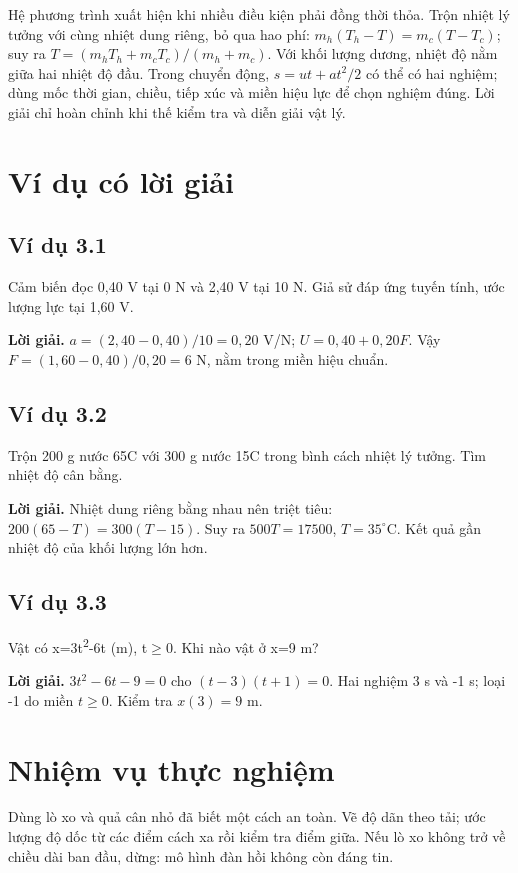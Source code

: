 \documentclass[11pt,a4paper,openany]{book}
\begin{document}
Hệ phương trình xuất hiện khi nhiều điều kiện phải đồng thời thỏa. Trộn nhiệt lý tưởng với cùng nhiệt dung riêng, bỏ qua hao phí: $m_h(T_h-T)=m_c(T-T_c)$; suy ra $T=(m_hT_h+m_cT_c)/(m_h+m_c)$. Với khối lượng dương, nhiệt độ nằm giữa hai nhiệt độ đầu. Trong chuyển động, $s=ut+at^2/2$ có thể có hai nghiệm; dùng mốc thời gian, chiều, tiếp xúc và miền hiệu lực để chọn nghiệm đúng. Lời giải chỉ hoàn chỉnh khi thế kiểm tra và diễn giải vật lý.
\begin{center}
\end{center}
\section{Ví dụ có lời giải}
\subsection*{Ví dụ 3.1}
Cảm biến đọc 0,40 V tại 0 N và 2,40 V tại 10 N. Giả sử đáp ứng tuyến tính, ước lượng lực tại 1,60 V.

\textbf{Lời giải.} $a=(2{,}40-0{,}40)/10=0{,}20$ V/N; $U=0{,}40+0{,}20F$. Vậy $F=(1{,}60-0{,}40)/0{,}20=6$ N, nằm trong miền hiệu chuẩn.
\subsection*{Ví dụ 3.2}
Trộn 200 g nước 65\textdegree{}C với 300 g nước 15\textdegree{}C trong bình cách nhiệt lý tưởng. Tìm nhiệt độ cân bằng.

\textbf{Lời giải.} Nhiệt dung riêng bằng nhau nên triệt tiêu: $200(65-T)=300(T-15)$. Suy ra $500T=17500$, $T=35^\circ$C. Kết quả gần nhiệt độ của khối lượng lớn hơn.
\subsection*{Ví dụ 3.3}
Vật có x=3t\textsuperscript{2}-6t (m), t\ensuremath{\ge}0. Khi nào vật ở x=9 m?

\textbf{Lời giải.} $3t^2-6t-9=0$ cho $(t-3)(t+1)=0$. Hai nghiệm 3 s và -1 s; loại -1 do miền $t\ge0$. Kiểm tra $x(3)=9$ m.
\section{Nhiệm vụ thực nghiệm}
Dùng lò xo và quả cân nhỏ đã biết một cách an toàn. Vẽ độ dãn theo tải; ước lượng độ dốc từ các điểm cách xa rồi kiểm tra điểm giữa. Nếu lò xo không trở về chiều dài ban đầu, dừng: mô hình đàn hồi không còn đáng tin.
\end{document}
